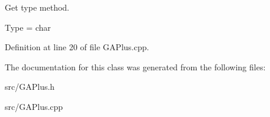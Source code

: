 Get type method. 

Type = char 

Definition at line 20 of file G\-A\-Plus.\-cpp.



The documentation for this class was generated from the following files\-:\begin{DoxyCompactItemize}
\item 
src/G\-A\-Plus.\-h\item 
src/G\-A\-Plus.\-cpp\end{DoxyCompactItemize}
